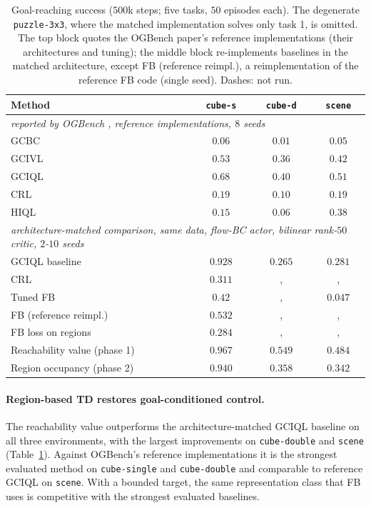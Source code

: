 \documentclass{article}
\begin{document}
\begin{table}[t]
\centering\small
\begin{tabular}{l ccc}
\toprule
Method & \texttt{cube-s} & \texttt{cube-d} & \texttt{scene} \\
\midrule
\multicolumn{4}{l}{\emph{reported by OGBench \citep{park2024ogbench}, reference implementations, $8$ seeds}} \\
GCBC   & $0.06$ & $0.01$ & $0.05$ \\
GCIVL  & $0.53$ & $0.36$ & $0.42$ \\
GCIQL  & $0.68$ & $0.40$ & $0.51$ \\
CRL    & $0.19$ & $0.10$ & $0.19$ \\
HIQL   & $0.15$ & $0.06$ & $0.38$ \\
\midrule
\multicolumn{4}{l}{\emph{architecture-matched comparison, same data, flow-BC actor, bilinear rank-$50$ critic, $2$-$10$ seeds}} \\
GCIQL baseline           & $0.928$ & $0.265$ & $0.281$ \\
CRL                      & $0.311$ & ,     & ,     \\
Tuned FB                 & $0.42$  & ,     & $0.047$ \\
FB (reference reimpl.)   & $0.532$ & ,     & ,     \\
FB loss on regions       & $0.284$ & ,     & ,     \\
\midrule
Reachability value (phase 1) & $\mathbf{0.967}$ & $\mathbf{0.549}$ & $\mathbf{0.484}$ \\
Region occupancy (phase 2)   & $0.940$ & $0.358$ & $0.342$ \\
\bottomrule
\end{tabular}
\caption{Goal-reaching success ($500$k steps; five tasks, $50$ episodes each).
The degenerate \texttt{puzzle-3x3}, where the matched implementation solves only task 1, is omitted.
The top block quotes the OGBench paper's reference implementations (their architectures and tuning); the middle block re-implements baselines in the matched architecture, except FB (reference reimpl.), a reimplementation of the reference FB code (single seed).
Dashes: not run.}
\label{tab:main}
\end{table}

\paragraph{Region-based TD restores goal-conditioned control.}
The reachability value outperforms the architecture-matched GCIQL baseline on all three environments, with the largest improvements on \texttt{cube-double} and \texttt{scene} (Table~\ref{tab:main}).
Against OGBench's reference implementations it is the strongest evaluated method on \texttt{cube-single} and \texttt{cube-double} and comparable to reference GCIQL on \texttt{scene}.
With a bounded target, the same representation class that FB uses is competitive with the strongest evaluated baselines.
\end{document}
